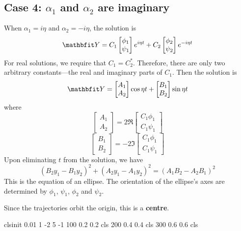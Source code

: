 \subsection{Case 4: $\alpha_1$ and $\alpha_2$ are imaginary}

When $\alpha_1=i\eta$ and $\alpha_2=-i\eta$, the solution is
$$\vect{Y}= C_1 \begin{bmatrix} \phi_1 \\ \psi_1 \end{bmatrix} e^{i\eta t}
+C_2 \begin{bmatrix} \phi_2 \\ \psi_2 \end{bmatrix} e^{-i\eta t}$$
For real solutions, we require that $C_1=C_2^*$.  Therefore, there are only
two arbitrary constants---the real and imaginary parts of $C_1$.
Then the solution is
$$\vect{Y}=
\begin{bmatrix} A_1 \\ A_2 \end{bmatrix} \cos\eta t
+\begin{bmatrix} B_1\\ B_2 \end{bmatrix} \sin\eta t$$
where
$$\begin{bmatrix} A_1 \\ A_2 \end{bmatrix} = 
2\Re \begin{bmatrix} C_1\phi_1 \\ C_1\psi_1 \end{bmatrix}$$
$$\begin{bmatrix} B_1 \\ B_2 \end{bmatrix} = 
-2\Im \begin{bmatrix} C_1\phi_1 \\ C_1\psi_1 \end{bmatrix}$$
Upon eliminating $t$ from the solution, we have
$$(B_2y_1-B_1y_2)^2 + (A_2y_1-A_1y_2)^2 = (A_1B_2-A_2B_1)^2$$
This is the equation of an ellipse.  The orientation of the ellipse's axes
are determined by $\phi_1$, $\psi_1$, $\phi_2$ and $\psi_2$.

Since the trajectories orbit the origin, this is a \textbf{centre}.

\begin{center}
\phaseportrait
{      clsinit 0.01 1 -2 5 -1
      100 0.2 0.2 cls    200 0.4 0.4 cls    300 0.6 0.6 cls}
{}
\end{center}

